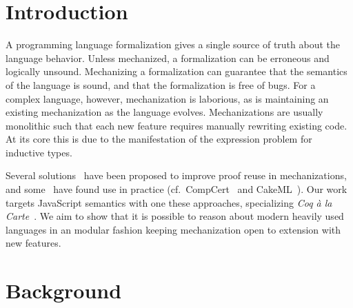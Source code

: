 \documentclass[sigplan,nonacm,review]{acmart}
\begin{document}


\maketitle

\section{Introduction}

A programming language formalization gives a single source of truth
about the language behavior.
Unless mechanized,
a formalization can be erroneous and logically unsound.
Mechanizing a formalization can guarantee that
the semantics of the language is sound,
and that
the formalization is free of bugs.
For a complex language, however,
mechanization is laborious,
as is maintaining an existing mechanization as the language evolves. Mechanizations are usually monolithic
such that each new feature requires manually rewriting existing code.
At its core this is due to the manifestation of the expression problem for inductive types. 

Several solutions~\cite{jin2023extensible, vistrup2025program, van2022intrinsically, forster2020coq} have been proposed to improve proof reuse in mechanizations, and some~\cite{ebresafe2025certified} have found use in practice (cf.~CompCert~\cite{leroy2016compcert} and CakeML~\cite{kumar2014cakeml}). Our work targets JavaScript semantics with one these approaches, specializing \emph{Coq à la Carte}~\cite{forster2020coq}. We aim to show that it is possible to reason about modern heavily used languages in an modular fashion keeping mechanization open to extension with new features. 



\section{Background}
\end{document}
